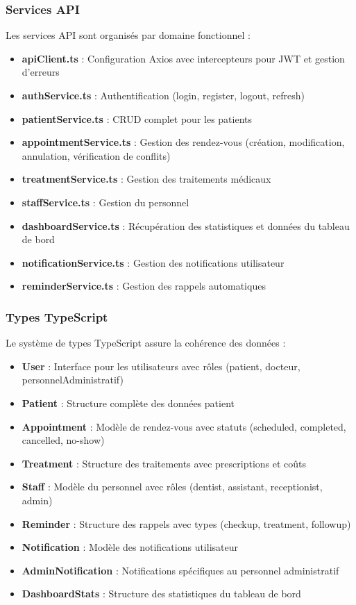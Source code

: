\documentclass[12pt,a4paper]{report}
\begin{document}
\subsubsection{Services API}

Les services API sont organisés par domaine fonctionnel :

\begin{itemize}
    \item \textbf{apiClient.ts} : Configuration Axios avec intercepteurs pour JWT et gestion d'erreurs
    \item \textbf{authService.ts} : Authentification (login, register, logout, refresh)
    \item \textbf{patientService.ts} : CRUD complet pour les patients
    \item \textbf{appointmentService.ts} : Gestion des rendez-vous (création, modification, annulation, vérification de conflits)
    \item \textbf{treatmentService.ts} : Gestion des traitements médicaux
    \item \textbf{staffService.ts} : Gestion du personnel
    \item \textbf{dashboardService.ts} : Récupération des statistiques et données du tableau de bord
    \item \textbf{notificationService.ts} : Gestion des notifications utilisateur
    \item \textbf{reminderService.ts} : Gestion des rappels automatiques
\end{itemize}

\subsubsection{Types TypeScript}

Le système de types TypeScript assure la cohérence des données :

\begin{itemize}
    \item \textbf{User} : Interface pour les utilisateurs avec rôles (patient, docteur, personnelAdministratif)
    \item \textbf{Patient} : Structure complète des données patient
    \item \textbf{Appointment} : Modèle de rendez-vous avec statuts (scheduled, completed, cancelled, no-show)
    \item \textbf{Treatment} : Structure des traitements avec prescriptions et coûts
    \item \textbf{Staff} : Modèle du personnel avec rôles (dentist, assistant, receptionist, admin)
    \item \textbf{Reminder} : Structure des rappels avec types (checkup, treatment, followup)
    \item \textbf{Notification} : Modèle des notifications utilisateur
    \item \textbf{AdminNotification} : Notifications spécifiques au personnel administratif
    \item \textbf{DashboardStats} : Structure des statistiques du tableau de bord
\end{itemize}
\end{document}
